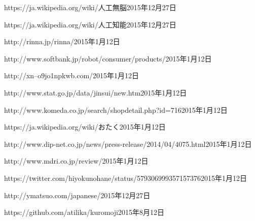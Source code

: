 \documentclass[a4paper,10pt,onecolumn,oneside,openany]{jsbook}
\begin{document}
\begin{thebibliography}{99}
	{https://ja.wikipedia.org/wiki/人工無脳}{2015年12月27日}

	{https://ja.wikipedia.org/wiki/人工知能}{2015年12月27日}


	{http://rinna.jp/rinna/}{2015年1月12日}

	{http://www.softbank.jp/robot/consumer/products/}{2015年1月12日}

	{http://xn--o9jo1npkwb.com/}{2015年1月12日}

	{http://www.stat.go.jp/data/jinsui/new.htm}{2015年1月12日}

	{http://www.komeda.co.jp/search/shopdetail.php?id=716}{2015年1月12日}

	{https://ja.wikipedia.org/wiki/おたく}{2015年1月12日}

	{http://www.dip-net.co.jp/news/press-release/2014/04/4075.html}{2015年1月12日}

	{http://www.mdri.co.jp/review/}{2015年1月12日}

	{https://twitter.com/hiyokunohane/status/579306999357157376}{2015年1月12日}

	{http://ymatsuo.com/japanese/}{2015年12月27日}







	{https://github.com/atilika/kuromoji}{2015年8月12日}

\end{thebibliography}
\end{document}
